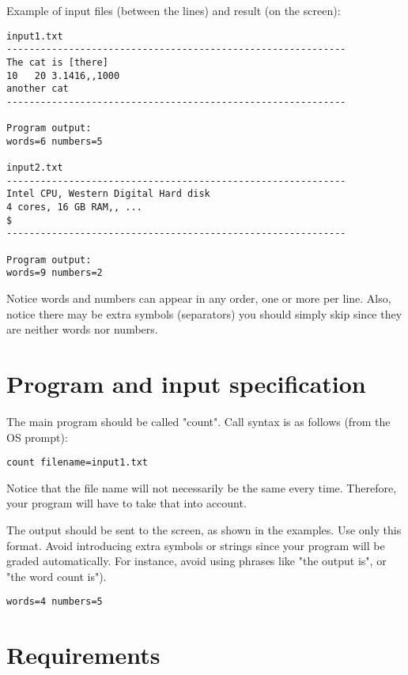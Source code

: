 Example of input files (between the lines) and result (on the screen):
\begin{verbatim}
input1.txt
------------------------------------------------------------
The cat is [there]
10   20 3.1416,,1000
another cat
------------------------------------------------------------

Program output:
words=6 numbers=5

input2.txt
------------------------------------------------------------
Intel CPU, Western Digital Hard disk
4 cores, 16 GB RAM,, ...
$
------------------------------------------------------------

Program output:
words=9 numbers=2

\end{verbatim}

Notice words and numbers can appear in any order, one or more per line.
Also, notice there may be extra symbols (separators) you should simply skip since they are neither words nor numbers.

\section{Program and input specification}

The main program should be called "count". Call syntax is as follows (from the OS prompt):
\begin{verbatim}
count filename=input1.txt
\end{verbatim}

Notice that the file name will not necessarily be the same every time. 
Therefore,  your program will have to take that into account. 

The output should be sent to the screen, as shown in the examples. 
Use only this format. 
Avoid introducing extra symbols or strings since your program will be graded automatically.
For instance, avoid using phrases like "the output is", or "the word count is").
\begin{verbatim}
words=4 numbers=5
\end{verbatim}


\section{Requirements}

